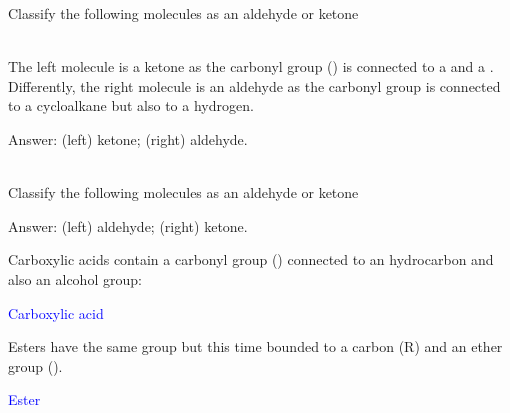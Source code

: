 \documentclass[main.tex]{subfiles}
\newcommand{\mytriangleright}[1]{\tikz{\filldraw[draw=#1,fill=#1] (0,0) --(0em,0.6em) -- (0.4em,0.3em);}}
\begin{document}
\begin{description}
\begin{example} %
Classify the following molecules as an aldehyde or ketone
\begin{center} \hspace{0.5cm}  \end{center}
\\
The left molecule is a ketone as the carbonyl group () is connected to a  and a  . Differently, the right molecule is an aldehyde as the carbonyl group is connected to a cycloalkane but also to a hydrogen. 
\begin{flushright} \mytriangleright{dgreen}\small Answer: (left) ketone; (right) aldehyde. \end{flushright}
\faDiamond\ \\
Classify the following molecules as an aldehyde or ketone
\begin{center} \hspace{0.5cm}  \end{center}
\begin{flushright} \mytriangleright{dgreen}\small Answer: (left) aldehyde; (right) ketone. \end{flushright}
\end{example}%







\item[\docfilehook{  Carboxylic acids and esters}{Carboxylic acids and esters}] Carboxylic acids contain a carbonyl group () connected to an hydrocarbon and also an alcohol group:
\begin{center}\hspace{0.5cm}\textcolor{blue}{Carboxylic acid}\end{center}
Esters have the same  group but this time bounded to a carbon (R) and an ether group (). 
\begin{center}\hspace{0.5cm}\textcolor{blue}{Ester}\end{center}


\end{description}
\end{document}
